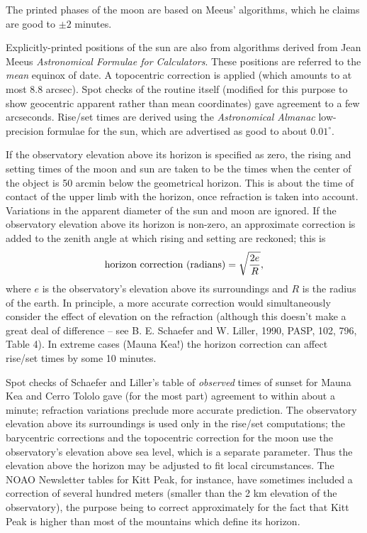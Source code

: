 The printed phases of the moon are based on Meeus' algorithms, which he 
claims are good to $\pm 2$ minutes.
\par
Explicitly-printed positions of the sun are also from algorithms derived 
from Jean Meeus {\it Astronomical Formulae for Calculators}.  These positions 
are referred to the {\it mean} equinox of date.  A topocentric correction 
is applied (which amounts to at most 8.8 arcsec).  Spot checks of the routine 
itself (modified for this purpose to show geocentric apparent rather than 
mean coordinates) gave agreement to a few arcseconds.  Rise/set times are 
derived using the {\it Astronomical Almanac} low-precision formulae for 
the sun, which are advertised as good to about $0.01^{\circ}$.
\par
If the observatory elevation above its horizon is specified as zero, the 
rising and setting times of the moon and sun are taken to be the times when
the center of the object is 50 arcmin below the geometrical horizon.  This 
is about the time of contact of the upper limb with the horizon, once 
refraction is taken into account.  Variations in the apparent diameter of 
the sun and moon are ignored.  If the observatory elevation above its 
horizon is non-zero, an approximate correction is added to the zenith 
angle at which rising and setting are reckoned; this is 
$$\hbox{horizon correction (radians)} = \sqrt{2 e \over R},$$
where $e$ is the observatory's elevation above its surroundings and $R$ 
is the radius of the earth.  In principle, a more accurate correction 
would simultaneously consider the effect of elevation on the refraction 
(although this doesn't make a great deal of difference -- see B. E. Schaefer 
and W. Liller, 1990, PASP, 102, 796, Table 4). In extreme cases (Mauna Kea!) 
the horizon correction can affect rise/set times by some 10 minutes.

Spot checks of Schaefer and Liller's table of {\it observed} times of sunset 
for Mauna Kea and Cerro Tololo gave (for the most part) agreement to within 
about a minute; refraction variations preclude more accurate prediction.  
The observatory elevation above its surroundings is used only in the rise/set 
computations; the barycentric corrections and the topocentric correction 
for the moon use the observatory's elevation above sea level, which is a 
separate parameter.  Thus the elevation above the horizon may be adjusted 
to fit local circumstances.  The NOAO Newsletter tables for Kitt Peak, for 
instance, have sometimes included a correction of several hundred meters 
(smaller than the 2 km elevation of the observatory), the purpose being to 
correct approximately for the fact that Kitt Peak is higher than most of 
the mountains which define its horizon.

